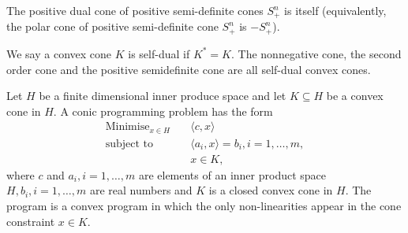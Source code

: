 \begin{proposition}
    The positive dual cone of positive semi-definite cones \(S_+^n\) is itself (equivalently, the polar cone of positive semi-definite cone \(S_+^n\) is \(-S_+^n\)).
\end{proposition}

\begin{definition}
    We say a convex cone \(K\) is self-dual if \(K^* = K\). The nonnegative cone, the second order cone and the positive semidefinite cone are all self-dual convex cones.
\end{definition}

Let \(H\) be a finite dimensional inner produce space and let \(K \subseteq H\) be a convex cone in \(H\). A conic programming problem has the form
\begin{align*}
    \text{Minimise}_{x \in H} \quad & \langle c, x \rangle                           \\
    \text{subject to} \quad         & \langle a_i, x \rangle = b_i, i = 1, \dots, m, \\
                                    & x \in K,
\end{align*}
where \(c\) and \(a_i, i = 1, \dots, m\) are elements of an inner product space \(H, b_i, i = 1, \dots, m\) are real numbers and \(K\) is a closed convex cone in \(H\). The program is a convex program in which the only non-linearities appear in the cone constraint \(x \in K\). \\

